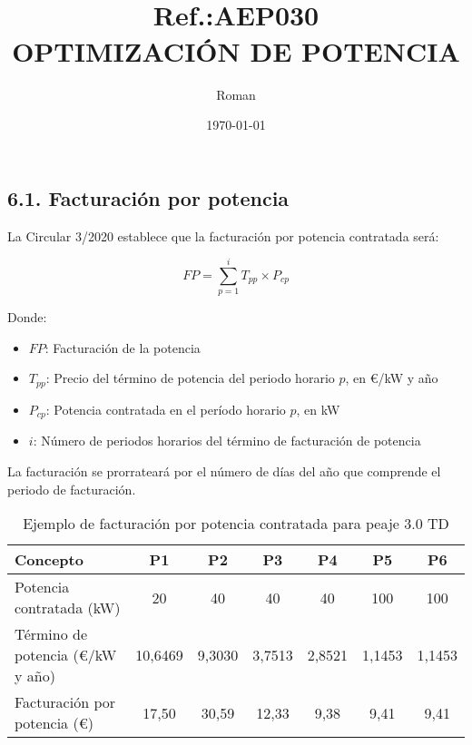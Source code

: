 \documentclass[a4paper,10pt,twocolumn]{article}
\title{{ \qrcode[height=1.3cm]{https://doctec.blog/} \\ \small Ref.:\uppercase{Aep030}}\\{\textbf{OPTIMIZACIÓN DE POTENCIA}}}
\author{
Roman
}
\date{\today}
\begin{document}
\begin{Form}
	\maketitle

	\tableofcontents  %
	\listoffigures    %
	\listoftables     %



    
\newpage






\section*{6.1. Facturación por potencia}

La Circular 3/2020 establece que la facturación por potencia contratada será:

\[ FP = \sum_{p=1}^{i} T_{pp} \times P_{cp} \]

Donde:
\begin{itemize}
    \item $FP$: Facturación de la potencia
    \item $T_{pp}$: Precio del término de potencia del periodo horario $p$, en €/kW y año
    \item $P_{cp}$: Potencia contratada en el período horario $p$, en kW \cite{precios}
    \item $i$: Número de periodos horarios del término de facturación de potencia
\end{itemize}

La facturación se prorrateará por el número de días del año que comprende el periodo de facturación.


\begin{table}[h]
\centering
\caption{Ejemplo de facturación por potencia contratada para peaje 3.0 TD}
\begin{tabular}{lcccccc}
\toprule
Concepto & P1 & P2 & P3 & P4 & P5 & P6 \\
\midrule
Potencia contratada (kW) & 20 & 40 & 40 & 40 & 100 & 100 \\
Término de potencia (€/kW y año) & 10,6469 & 9,3030 & 3,7513 & 2,8521 & 1,1453 & 1,1453 \\
Facturación por potencia (€) & 17,50 & 30,59 & 12,33 & 9,38 & 9,41 & 9,41 \\
\bottomrule
\end{tabular}
\end{table}





\end{Form}
\end{document}
